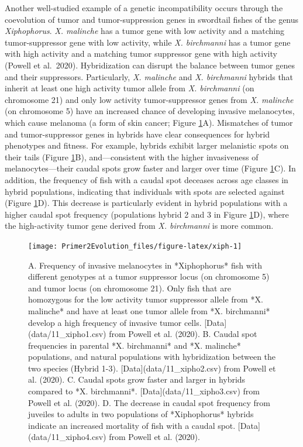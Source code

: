 \documentclass[
]{book}
\begin{document}
Another well-studied example of a genetic incompatibility occurs through the coevolution of tumor and tumor-suppression genes in swordtail fishes of the genus \emph{Xiphophorus}. \emph{X. malinche} has a tumor gene with low activity and a matching tumor-suppressor gene with low activity, while \emph{X. birchmanni} has a tumor gene with high activity and a matching tumor suppressor gene with high activity (Powell et al.~2020). Hybridization can disrupt the balance between tumor genes and their suppressors. Particularly, \emph{X. malinche} and \emph{X. birchmanni} hybrids that inherit at least one high activity tumor allele from \emph{X. birchmanni} (on chromosome 21) and only low activity tumor-suppressor genes from \emph{X. malinche} (on chromosome 5) have an increased chance of developing invasive melanocytes, which cause melanoma (a form of skin cancer; Figure \ref{fig:xiph}A). Mismatches of tumor and tumor-suppressor genes in hybrids have clear consequences for hybrid phenotypes and fitness. For example, hybrids exhibit larger melanistic spots on their tails (Figure \ref{fig:xiph}B), and---consistent with the higher invasiveness of melanocytes---their caudal spots grow faster and larger over time (Figure \ref{fig:xiph}C). In addition, the frequency of fish with a caudal spot deceases across age classes in hybrid populations, indicating that individuals with spots are selected against (Figure \ref{fig:xiph}D). This decrease is particularly evident in hybrid populations with a higher caudal spot frequency (populations hybrid 2 and 3 in Figure \ref{fig:xiph}D), where the high-activity tumor gene derived from \emph{X. birchmanni} is more common.

\begin{figure}
\texttt{[image: Primer2Evolution\_files/figure-latex/xiph-1]} \caption{A. Frequency of invasive melanocytes in *Xiphophorus* fish with different genotypes at a tumor suppressor locus (on chromosome 5) and tumor locus (on chromosome 21). Only fish that are homozygous for the low activity tumor suppressor allele from *X. malinche* and have at least one tumor allele from *X. birchmanni* develop a high frequency of invasive tumor cells. [Data](data/11_xipho1.csv) from Powell et al. (2020). B. Caudal spot frequencies in parental *X. birchmanni* and *X. malinche* populations, and natural populations with hybridization between the two species (Hybrid 1-3). [Data](data/11_xipho2.csv) from Powell et al. (2020). C. Caudal spots grow faster and larger in hybrids compared to *X. birchmanni*. [Data](data/11_xipho3.csv) from Powell et al. (2020). D. The decrease in caudal spot frequency from juveiles to adults in two populations of *Xiphophorus* hybrids indicate an increased mortality of fish with a caudal spot. [Data](data/11_xipho4.csv) from Powell et al. (2020).}\label{fig:xiph}
\end{figure}
\end{document}
